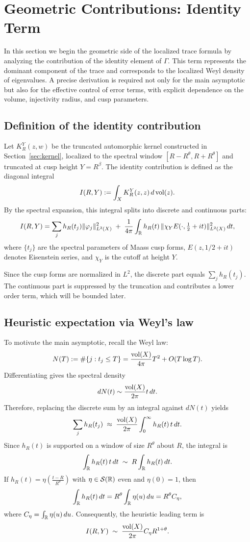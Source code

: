 \section{Geometric Contributions: Identity Term}\label{sec:geom-identity}

In this section we begin the geometric side of the localized trace formula by analyzing the contribution of the identity element of $\Gamma$. This term represents the dominant component of the trace and corresponds to the localized Weyl density of eigenvalues. A precise derivation is required not only for the main asymptotic but also for the effective control of error terms, with explicit dependence on the volume, injectivity radius, and cusp parameters.

\subsection{Definition of the identity contribution}\label{subsec:identity-def}

Let $K_R^Y(z,w)$ be the truncated automorphic kernel constructed in Section~\ref{sec:kernel}, localized to the spectral window $[R-R^\theta, R+R^\theta]$ and truncated at cusp height $Y=R^\beta$. The identity contribution is defined as the diagonal integral
\[
I(R,Y) := \int_X K_R^Y(z,z)\,d\operatorname{vol}(z).
\]
By the spectral expansion, this integral splits into discrete and continuous parts:
\begin{equation}\label{eq:identity-spectral}
I(R,Y) = \sum_j h_R(t_j)\|\varphi_j\|_{L^2(X)}^2 \;+\;
\frac{1}{4\pi}\int_{\mathbb{R}} h_R(t)\,\|\chi_Y E(\cdot,\tfrac12+it)\|_{L^2(X)}^2\,dt,
\end{equation}
where $\{t_j\}$ are the spectral parameters of Maass cusp forms, $E(z,1/2+it)$ denotes Eisenstein series, and $\chi_Y$ is the cutoff at height $Y$.

Since the cusp forms are normalized in $L^2$, the discrete part equals $\sum_j h_R(t_j)$. The continuous part is suppressed by the truncation and contributes a lower order term, which will be bounded later.

\subsection{Heuristic expectation via Weyl’s law}\label{subsec:identity-weyl}

To motivate the main asymptotic, recall the Weyl law:
\[
N(T) := \#\{ j : t_j \leq T \} = \frac{\operatorname{vol}(X)}{4\pi}T^2 + O(T\log T).
\]
Differentiating gives the spectral density
\[
dN(t) \sim \frac{\operatorname{vol}(X)}{2\pi}t\,dt.
\]
Therefore, replacing the discrete sum by an integral against $dN(t)$ yields
\[
\sum_j h_R(t_j) \;\approx\; \frac{\operatorname{vol}(X)}{2\pi}\int_0^\infty h_R(t)\,t\,dt.
\]
Since $h_R(t)$ is supported on a window of size $R^\theta$ about $R$, the integral is
\[
\int_{\mathbb{R}} h_R(t)\,t\,dt \;\sim\; R\int_{\mathbb{R}} h_R(t)\,dt.
\]
If $h_R(t) = \eta\!\left(\tfrac{t-R}{R^\theta}\right)$ with $\eta \in \mathcal{S}(\mathbb{R})$ even and $\eta(0)=1$, then
\[
\int_{\mathbb{R}} h_R(t)\,dt = R^\theta \int_{\mathbb{R}} \eta(u)\,du = R^\theta C_\eta,
\]
where $C_\eta = \int_{\mathbb{R}} \eta(u)\,du$. Consequently, the heuristic leading term is
\[
I(R,Y) \;\sim\; \frac{\operatorname{vol}(X)}{2\pi}C_\eta R^{1+\theta}.
\]

